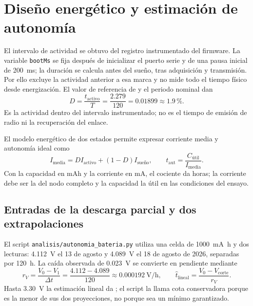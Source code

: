 \section{Diseño energético y estimación de autonomía}
\label{sec:metodo-autonomia}
El intervalo de actividad se obtuvo del registro instrumentado del firmware. La variable \texttt{bootMs} se fija después de inicializar el puerto serie y de una pausa inicial de 200~ms; la duración se calcula antes del sueño, tras adquisición y transmisión. Por ello excluye la actividad anterior a esa marca y no mide todo el tiempo físico desde energización. El valor de referencia de \TiempoActivo{} y el periodo nominal dan
\begin{equation}
D=\frac{t_{\mathrm{activo}}}{T}=\frac{2.279}{120}=0.01899\approx1.9\,\text{\%}.
\label{eq:metodo-duty}
\end{equation}
Es la actividad dentro del intervalo instrumentado; no es el tiempo de emisión de radio ni la recuperación del enlace.

El modelo energético de dos estados permite expresar corriente media y autonomía ideal como
\begin{equation}
I_{\mathrm{media}}=D I_{\mathrm{activo}}+(1-D)I_{\text{sueño}},
\qquad
t_{\mathrm{aut}}=\frac{C_{\text{útil}}}{I_{\mathrm{media}}}.
\label{eq:metodo-autonomia-corriente}
\end{equation}
Con la capacidad en mAh y la corriente en mA, el cociente da horas; la corriente debe ser la del nodo completo y la capacidad la útil en las condiciones del ensayo.

\subsection{Entradas de la descarga parcial y dos extrapolaciones}
El script \texttt{analisis/autonomia\_bateria.py} utiliza una celda de \SI{1000}{\milli\ampere\hour} y dos lecturas: \SI{4.112}{\volt} el 13 de agosto y \SI{4.089}{\volt} el 18 de agosto de 2026, separadas por \SI{120}{\hour}. La caída observada de \SI{0.023}{\volt} se convierte en pendiente mediante
\begin{equation}
r_V=\frac{V_0-V_1}{\Delta t}=\frac{4.112-4.089}{120}
\approx 0.000192~\mathrm{V/h},
\qquad
\widehat{t}_{\mathrm{lineal}}=\frac{V_0-V_{\mathrm{corte}}}{r_V}.
\label{eq:metodo-lineal}
\end{equation}
Hasta \SI{3.30}{\volt} la estimación lineal da \AutonomiaLinealEstimada{}; el script la llama cota conservadora porque es la menor de sus dos proyecciones, no porque sea un mínimo garantizado.

